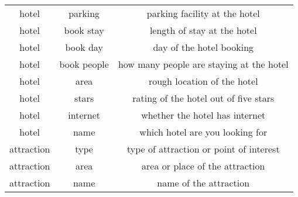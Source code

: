 \documentclass[11pt]{article}
\begin{document}
\begin{table*}[t]
\begin{tabular}{ccc}
        hotel  & parking  &  parking facility at the hotel\\
        hotel  & book stay &    length of stay at the hotel\\
        hotel  & book day  &     day of the hotel booking\\
        hotel & book people &      how many people are staying at the hotel\\
        hotel  &   area  &  rough location of the hotel\\
        hotel  & stars  &     rating of the hotel out of five stars\\
        hotel  &  internet  &  whether the hotel has internet\\
        hotel  &  name   &   which hotel are you looking for\\
        attraction   & type &   type of attraction or point of interest\\
        attraction &  area    &    area or place of the attraction\\
        attraction  &  name   &  name of the attraction\\
        \bottomrule
    \end{tabular}
\end{table*}
 
\end{document}
